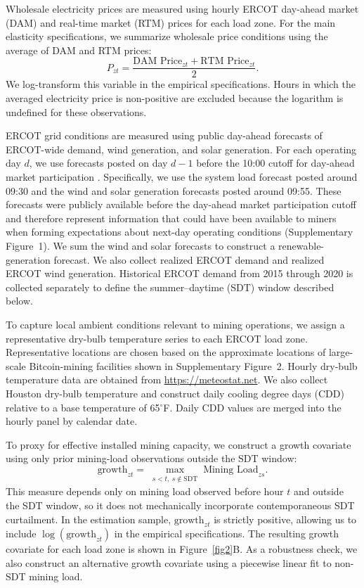 \documentclass[pdflatex,sn-mathphys-num]{sn-jnl}%
\theoremstyle{thmstyleone}%
\theoremstyle{thmstyletwo}%
\theoremstyle{thmstylethree}%
\begin{document}
Wholesale electricity prices are measured using hourly ERCOT day-ahead market (DAM) and real-time market (RTM) prices for each load zone. For the main elasticity specifications, we summarize wholesale price conditions using the average of DAM and RTM prices:
\begin{equation}
P_{zt}
= \frac{\text{DAM Price}_{zt} + \text{RTM Price}_{zt}}{2}.
\end{equation}
We log-transform this variable in the empirical specifications. Hours in which the averaged electricity price is non-positive are excluded because the logarithm is undefined for these observations.

ERCOT grid conditions are measured using public day-ahead forecasts of ERCOT-wide demand, wind generation, and solar generation. For each operating day $d$, we use forecasts posted on day $d-1$ before the 10{:}00 cutoff for day-ahead market participation \cite{ERCOT_Nodal_Protocols_2025}. Specifically, we use the system load forecast posted around 09{:}30 and the wind and solar generation forecasts posted around 09{:}55. These forecasts were publicly available before the day-ahead market participation cutoff and therefore represent information that could have been available to miners when forming expectations about next-day operating conditions (Supplementary Figure~1). We sum the wind and solar forecasts to construct a renewable-generation forecast. We also collect realized ERCOT demand and realized ERCOT wind generation. Historical ERCOT demand from 2015 through 2020 is collected separately to define the summer--daytime (SDT) window described below.

To capture local ambient conditions relevant to mining operations, we assign a representative dry-bulb temperature series to each ERCOT load zone. Representative locations are chosen based on the approximate locations of large-scale Bitcoin-mining facilities shown in Supplementary Figure~2. Hourly dry-bulb temperature data are obtained from \url{https://meteostat.net}. We also collect Houston dry-bulb temperature and construct daily cooling degree days (CDD) relative to a base temperature of 65$^\circ$F. Daily CDD values are merged into the hourly panel by calendar date.

To proxy for effective installed mining capacity, we construct a growth covariate using only prior mining-load observations outside the SDT window:
\begin{equation} 
\text{growth}_{zt} =  \max_{\substack{s < t, \ s \notin \text{SDT}}} \text{Mining Load}_{zs}. 
\end{equation}
This measure depends only on mining load observed before hour $t$ and outside the SDT window, so it does not mechanically incorporate contemporaneous SDT curtailment. In the estimation sample, $\text{growth}_{zt}$ is strictly positive, allowing us to include $\log(\text{growth}_{zt})$ in the empirical specifications. The resulting growth covariate for each load zone is shown in Figure~\ref{fig2}B. As a robustness check, we also construct an alternative growth covariate using a piecewise linear fit to non-SDT mining load.
\end{document}
